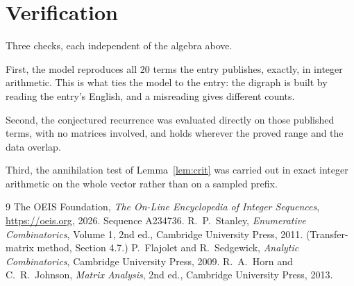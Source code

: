 \documentclass[11pt,a4paper]{article}
\theoremstyle{plain}
\theoremstyle{definition}
\begin{document}
\section{Verification}

Three checks, each independent of the algebra above.

First, the model reproduces all $20$ terms the entry publishes, exactly, in integer
arithmetic. This is what ties the model to the entry: the digraph is built by reading the
entry's English, and a misreading gives different counts.

Second, the conjectured recurrence was evaluated directly on those published terms, with no
matrices involved, and holds wherever the proved range and the data overlap.

Third, the annihilation test of Lemma~\ref{lem:crit} was carried out in exact integer
arithmetic on the whole vector rather than on a sampled prefix.

\begin{thebibliography}{9}
 The OEIS Foundation, \emph{The On-Line Encyclopedia of Integer
Sequences}, \url{https://oeis.org}, 2026. Sequence A234736.
 R.~P.~Stanley, \emph{Enumerative Combinatorics}, Volume 1, 2nd ed.,
Cambridge University Press, 2011. (Transfer-matrix method, Section 4.7.)
 P.~Flajolet and R.~Sedgewick, \emph{Analytic Combinatorics}, Cambridge
University Press, 2009.
 R.~A.~Horn and C.~R.~Johnson, \emph{Matrix Analysis}, 2nd ed., Cambridge
University Press, 2013.
\end{thebibliography}
\end{document}
